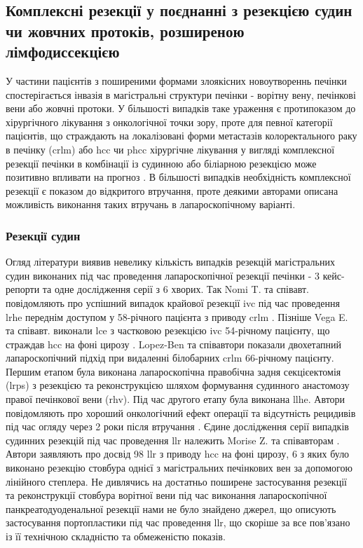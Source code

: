 \begin{refsection}
\subsection[Комплексні резекції]{Комплексні резекції у поєднанні з резекцією судин чи жовчних протоків, розширеною лімфодиссекцією}

У частини пацієнтів з поширеними формами злоякісних новоутвореннь печінки спостерігається інвазія в магістральні структури печінки - ворітну вену, печінкові вени або жовчні протоки. У більшості випадків таке ураження є протипоказом до хірургічного лікування з онкологічної точки зору, проте для певної категорії пацієнтів, що страждають на локалізовані форми метастазів колоректального раку в печінку (\acrshort{crlm}) або \acrshort{hcc} чи \acrshort{phcc} хірургічне лікування у вигляді комплексної резекції печінки в комбінації із судинною або біліарною резекцією може позитивно впливати на прогноз \cite{Kobayashi2015, Tardu2016, Procopio2020, Matsukuma2020}. В більшості випадків необхідність комплексної резекції є показом до відкритого втручання, проте деякими авторами описана можливість виконання таких втручань в лапароскопічному варіанті.

\subsubsection{Резекції судин}

Огляд літератури виявив невелику кількість випадків резекцій магістральних судин виконаних під час проведення лапароскопічної резекції печінки - 3 кейс-репорти та одне дослідження серії з 6 хворих. 
Так Nomi T. та співавт. повідомляють про успішний випадок крайової резекції \acrshort{ivc} під час проведення \acrshort{lrhe} переднім доступом у 58-річного пацієнта з приводу \acrshort{crlm} \cite{Nomi2015a}. Пізніше Vega E. та співавт. виконали \acrshort{lce} з частковою резекцією \acrshort{ivc} 54-річному пацієнту, що страждав \acrshort{hcc} на фоні цирозу \cite{Vega2020}. 
Lopez-Ben та співавтори показали двохетапний лапароскопічний підхід при видаленні білобарних \acrshort{crlm} 66-річному пацієнту. Першим етапом була виконана лапароскопічна правобічна задня секцієектомія (\acrshort{lrps}) з резекцією та реконструкцією шляхом формування судинного анастомозу правої печінкової вени (\acrshort{rhv}). Під час другого етапу була виконана \acrshort{llhe}. Автори повідомляють про хороший онкологічний ефект операції та відсутність рецидивів під час огляду через 2 роки після втручання \cite{Lopez-Ben2020}.
Єдине дослідження серії випадків судинних резекцій під час проведення \acrshort{llr} належить Morise Z. та співавторам \cite{Morise2015a}. Автори заявляють про досвід 98 \acrshort{llr} з приводу \acrshort{hcc} на фоні цирозу, 6 з яких було виконано резекцію стовбура однієї з магістральних печінкових вен за допомогою лінійного степлера.
Не дивлячись на достатньо поширене застосування резекції та реконструкції стовбура ворітної вени під час виконання лапароскопічної панкреатодуоденальної резекції \cite{Kendrick2011, Garbarino2018, Wei2019} нами не було знайдено джерел, що описують застосування портопластики під час проведення \acrshort{llr}, що скоріше за все пов'язано із її технічною складністю та обмеженістю показів. 


\end{refsection}

